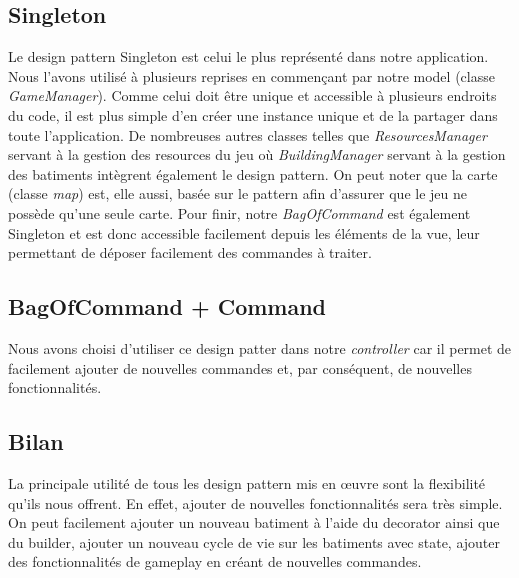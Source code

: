 \documentclass{article}
\begin{document}
\subsection{Singleton}
Le design pattern Singleton est celui le plus représenté dans notre application. Nous l'avons utilisé à plusieurs reprises en commençant par
notre model (classe \textit{GameManager}). Comme celui doit être unique et accessible à plusieurs endroits du code, il est plus simple d'en créer 
une instance unique et de la partager dans toute l'application. De nombreuses autres classes telles que \textit{ResourcesManager} servant à la gestion
des resources du jeu où \textit{BuildingManager} servant à la gestion des batiments intègrent également le design pattern. On peut noter que la carte 
(classe \textit{map}) est, elle aussi, basée sur le pattern afin d'assurer que le jeu ne possède qu'une seule carte. Pour finir, notre \textit{BagOfCommand}
est également Singleton et est donc accessible facilement depuis les éléments de la vue, leur permettant de déposer facilement des commandes à traiter.

\subsection{BagOfCommand + Command}
Nous avons choisi d'utiliser ce design patter dans notre \textit{controller} car il permet de facilement ajouter de nouvelles commandes et, par conséquent,
de nouvelles fonctionnalités. 

\subsection{Bilan}
La principale utilité de tous les design pattern mis en œuvre sont la flexibilité qu'ils nous offrent. En effet, ajouter de nouvelles fonctionnalités sera
très simple. On peut facilement ajouter un nouveau batiment à l'aide du decorator ainsi que du builder, ajouter un nouveau cycle de vie sur les batiments 
avec state, ajouter des fonctionnalités de gameplay en créant de nouvelles commandes.
\end{document}
